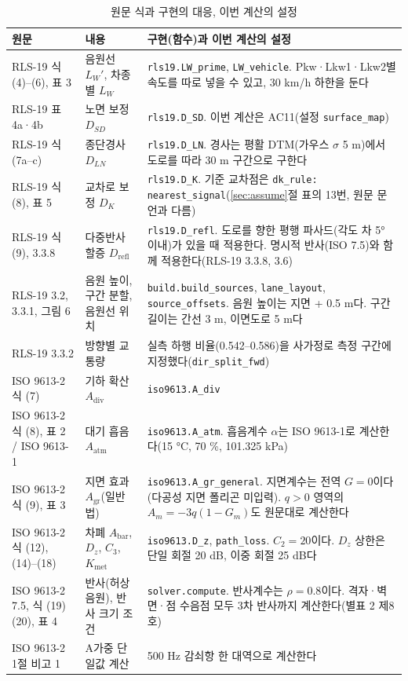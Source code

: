 \documentclass[10.5pt,a4paper]{article}
\newcommand{\hd}[1]{\cellcolor{headfill}\textbf{\sffamily #1}}
\begin{document}
\footnotesize
\begin{longtable}{L{0.22}L{0.30}L{0.48}}
\caption{원문 식과 구현의 대응, 이번 계산의 설정}\label{tab:impl}\\
\toprule
\hd{원문} & \hd{내용} & \hd{구현(함수)과 이번 계산의 설정} \\ \midrule
\endhead
\bottomrule
\endlastfoot
RLS-19 식 (4)--(6), 표 3 & 음원선 $L_W'$, 차종별 $L_W$ & \texttt{rls19.LW\_prime}, \texttt{LW\_vehicle}. Pkw·Lkw1·Lkw2별 속도를 따로 넣을 수 있고, 30 km/h 하한을 둔다 \\ \midrule
RLS-19 표 4a·4b & 노면 보정 $D_{SD}$ & \texttt{rls19.D\_SD}. 이번 계산은 AC11(설정 \texttt{surface\_map}) \\ \midrule
RLS-19 식 (7a--c) & 종단경사 $D_{LN}$ & \texttt{rls19.D\_LN}. 경사는 평활 DTM(가우스 $\sigma$ 5 m)에서 도로를 따라 30 m 구간으로 구한다 \\ \midrule
RLS-19 식 (8), 표 5 & 교차로 보정 $D_K$ & \texttt{rls19.D\_K}. 기준 교차점은 \texttt{dk\_rule: nearest\_signal}(\ref{sec:assume}절 표의 13번, 원문 문언과 다름) \\ \midrule
RLS-19 식 (9), 3.3.8 & 다중반사 할증 $D_{\mathrm{refl}}$ & \texttt{rls19.D\_refl}. 도로를 향한 평행 파사드(각도 차 5° 이내)가 있을 때 적용한다. 명시적 반사(ISO 7.5)와 함께 적용한다(RLS-19 3.3.8, 3.6) \\ \midrule
RLS-19 3.2, 3.3.1, 그림 6 & 음원 높이, 구간 분할, 음원선 위치 & \texttt{build.build\_sources}, \texttt{lane\_layout}, \texttt{source\_offsets}. 음원 높이는 지면 + 0.5 m다. 구간 길이는 간선 3 m, 이면도로 5 m다 \\ \midrule
RLS-19 3.3.2 & 방향별 교통량 & 실측 하행 비율(0.542--0.586)을 사가정로 측정 구간에 지정했다(\texttt{dir\_split\_fwd}) \\ \midrule
ISO 9613-2 식 (7) & 기하 확산 $A_{\mathrm{div}}$ & \texttt{iso9613.A\_div} \\ \midrule
ISO 9613-2 식 (8), 표 2 / ISO 9613-1 & 대기 흡음 $A_{\mathrm{atm}}$ & \texttt{iso9613.A\_atm}. 흡음계수 $\alpha$는 ISO 9613-1로 계산한다(15 °C, 70 \%, 101.325 kPa) \\ \midrule
ISO 9613-2 식 (9), 표 3 & 지면 효과 $A_{\mathrm{gr}}$(일반법) & \texttt{iso9613.A\_gr\_general}. 지면계수는 전역 $G = 0$이다(다공성 지면 폴리곤 미입력). $q > 0$ 영역의 $A_m = -3q(1-G_m)$도 원문대로 계산한다 \\ \midrule
ISO 9613-2 식 (12), (14)--(18) & 차폐 $A_{\mathrm{bar}}$, $D_z$, $C_3$, $K_{\mathrm{met}}$ & \texttt{iso9613.D\_z}, \texttt{path\_loss}. $C_2 = 20$이다. $D_z$ 상한은 단일 회절 20 dB, 이중 회절 25 dB다 \\ \midrule
ISO 9613-2 7.5, 식 (19)(20), 표 4 & 반사(허상음원), 반사 크기 조건 & \texttt{solver.compute}. 반사계수는 $\rho = 0.8$이다. 격자·벽면·점 수음점 모두 3차 반사까지 계산한다(별표 2 제8호) \\ \midrule
ISO 9613-2 1절 비고 1 & A가중 단일값 계산 & 500 Hz 감쇠항 한 대역으로 계산한다 \\
\end{longtable}
\normalsize
\end{document}
